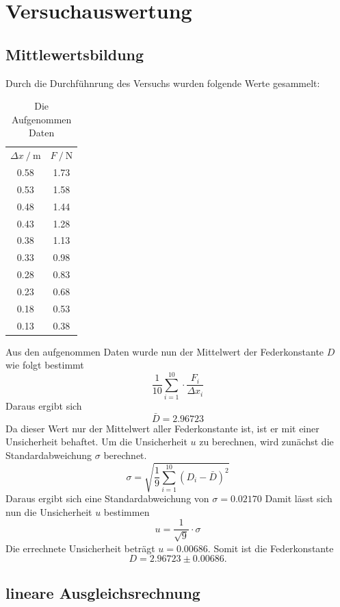   \section{Versuchauswertung}
  \subsection{Mittlewertsbildung}
Durch die Durchfühnrung des Versuchs wurden folgende Werte gesammelt:
\begin{table}
  \centering
  \caption{Die Aufgenommen Daten}
  \label{tab:Messdaten}
  \begin{tabular}{c c}
  \toprule
  $ \Delta x \:/\: \si{\meter}$ & $F \:/\: \si{\newton}$ \\
  0.58 & 1.73 \\
  0.53 & 1.58 \\
  0.48 & 1.44 \\
  0.43 & 1.28 \\
  0.38 & 1.13 \\
  0.33 & 0.98 \\
  0.28 & 0.83 \\
  0.23 & 0.68 \\
  0.18 & 0.53 \\
  0.13 & 0.38 \\
  \bottomrule
  \end{tabular}
\end{table}
\FloatBarrier
Aus den aufgenommen Daten wurde nun der Mittelwert der Federkonstante $D$ wie folgt bestimmt
\begin{equation}
 \frac{1}{10} \sum_{i=1}^{10} \cdot \frac{F_i}{\Delta x_i}
\end{equation}
Daraus ergibt sich
\begin{equation}
\bar{D} = 2.96723
\end{equation}
Da dieser Wert nur der Mittelwert aller Federkonstante ist, ist er mit einer Unsicherheit behaftet.
Um die Unsicherheit $u$ zu berechnen, wird zunächst die Standardabweichung $\sigma$ berechnet.
\begin{equation}
\sigma = \sqrt{\frac{1}{9} \sum_{i=1}^{10} (D_i - \bar{D})^2}
\end{equation}
Daraus ergibt sich eine Standardabweichung von $\sigma = 0.02170
$
Damit lässt sich nun die Unsicherheit $u$ bestimmen
\begin{equation}
u = \frac{1}{ \sqrt{9}} \cdot \sigma
\end{equation}
Die errechnete Unsicherheit beträgt $u = 0.00686$.
Somit ist die Federkonstante 
\begin{equation}
D = 2.96723 \pm 0.00686.
\end{equation}
\subsection{lineare Ausgleichsrechnung}

